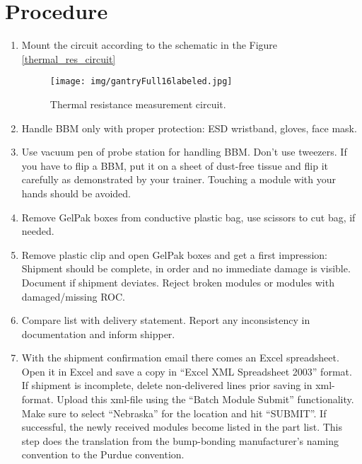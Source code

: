 \documentclass[12pt]{unlsilabsop}
\begin{document}
\section{Procedure}

\begin{enumerate}
    \item Mount the circuit according to the schematic in the Figure \ref{thermal_res_circuit}
      \begin{center}
        \begin{figure}[h]
          \texttt{[image: img/gantryFull16labeled.jpg]}
          \caption{Thermal resistance measurement circuit.}
          \label{gantry_setup}
        \end{figure}
      \end{center}

    \item Handle BBM only with proper protection: ESD wristband, gloves, face mask.
    \item Use vacuum pen of probe station for handling BBM. Don't use tweezers. If you have to flip a BBM, put it on a sheet of dust-free tissue and flip it carefully as demonstrated by your trainer. Touching a module with your hands should be avoided.
    \item Remove GelPak boxes from conductive plastic bag, use scissors to cut bag, if needed.
    \item Remove plastic clip and open GelPak boxes and get a first impression: Shipment should be complete, in order and no immediate damage is visible. Document if shipment deviates. Reject broken modules or modules with damaged/missing ROC.
    \item Compare list with delivery statement. Report any inconsistency in documentation and inform shipper.
    \item With the shipment confirmation email there comes an Excel spreadsheet. Open it in Excel and save a copy in ``Excel XML Spreadsheet 2003'' format. If shipment is incomplete, delete non-delivered lines prior saving in xml-format. Upload this xml-file using the ``Batch Module Submit'' functionality. Make sure to select ``Nebraska'' for the location and hit ``SUBMIT''. If successful, the newly received modules become listed in the part list. This step does the translation from the bump-bonding manufacturer's naming convention to the Purdue convention.


\end{enumerate}
\end{document}
